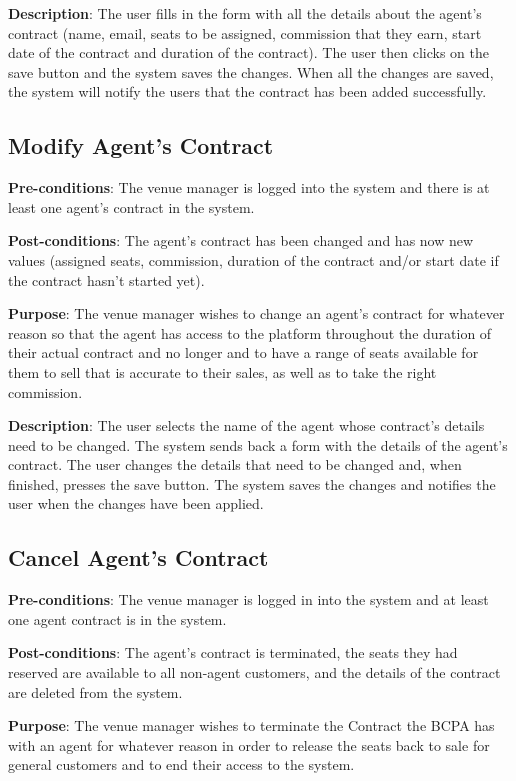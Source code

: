 \textbf{Description}: The user fills in the form with all the details
about the agent's contract (name, email, seats to be assigned,
commission that they earn, start date of the contract and duration
of the contract). The user then clicks on the save button and the
system saves the changes. When all the changes are saved, the
system will notify the users that the contract has been added
successfully.

\subsection{Modify Agent's Contract}
\textbf{Pre-conditions}: The venue manager is logged into the system
and there is at least one agent's contract in the system.

\textbf{Post-conditions}: The agent's contract has been changed and
has now new values (assigned seats, commission, duration of the
contract and/or start date if the contract hasn't started yet).

\textbf{Purpose}: The venue manager wishes to change an agent's
contract for whatever reason so that the agent has access to the
platform throughout the duration of their actual contract and no
longer and to have a range of seats available for them to sell that
is accurate to their sales, as well as to take the right commission.

\textbf{Description}: The user selects the name of the agent whose
contract's details need to be changed. The system sends back a form
with the details of the agent's contract. The user changes the details
that need to be changed and, when finished, presses the save button.
The system saves the changes and notifies the user when the changes
have been applied.

\subsection{Cancel Agent's Contract}
\textbf{Pre-conditions}: The venue manager is logged in into the
system and at least one agent contract is in the system.

\textbf{Post-conditions}: The agent's contract is terminated,
the seats they had reserved are available to all non-agent
customers, and the details of the contract are deleted from
the system.

\textbf{Purpose}: The venue manager wishes to terminate the Contract
the BCPA has with an agent for whatever reason in order to release
the seats back to sale for general customers and to end their access
to the system.

